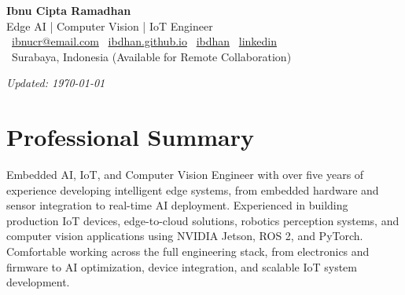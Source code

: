 
\begin{center}
    {\LARGE\bfseries\color{tealdark} Ibnu Cipta Ramadhan}\\[4pt]
    {\large Edge AI | Computer Vision | IoT Engineer}\\[6pt]
    \small
    \faEnvelope\ \href{mailto:your@email.com}{ibnucr@email.com} \quad
    \faGlobe\ \href{https://ibdhan.github.io}{ibdhan.github.io} \quad
    \faGithub\ \href{https://github.com/ibdhan}{ibdhan} \quad
    \faLinkedin\ \href{https://www.linkedin.com/in/ibnu-cipta-ramadhan-5b3662177/}{linkedin} \\
    \faMapMarker*\ Surabaya, Indonesia (Available for Remote Collaboration)
\end{center}

\vspace{4pt}
\noindent\textit{Updated: \today}

\section{Professional Summary}

\begin{sectionbody}

Embedded AI, IoT, and Computer Vision Engineer with over five years of experience developing intelligent edge systems, from embedded hardware and sensor integration to real-time AI deployment. 
Experienced in building production IoT devices, edge-to-cloud solutions, robotics perception systems, and computer vision applications using NVIDIA Jetson, ROS 2, and PyTorch. 
Comfortable working across the full engineering stack, from electronics and firmware to AI optimization, device integration, and scalable IoT system development.

\end{sectionbody}

\vspace{5pt}

